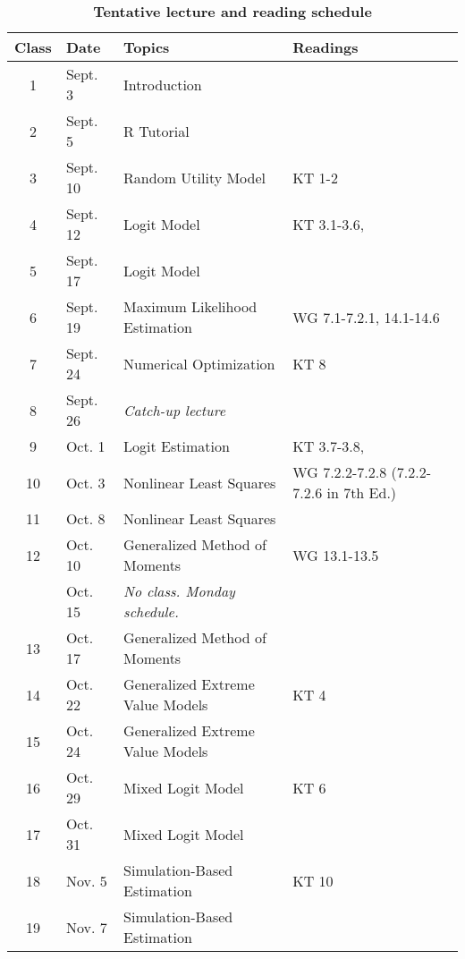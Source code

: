 \documentclass[11pt,letterpaper]{article}
\begin{document}
\begin{NoHyper}
\begin{table}[!ht]
	\centering
	\begin{threeparttable}
		\caption*{\textbf{Tentative lecture and reading schedule}}
   		\begin{tabular}{@{\extracolsep{0.35cm}} c l l l @{}}
    		\toprule
		    \textbf{Class} & \textbf{Date} & \textbf{Topics} & \textbf{Readings}\tnote{1} \\ \toprule
    		1 & Sept. 3 & Introduction & \\
    		2 & Sept. 5 & R Tutorial & \textcite{reiss_structural_2007}\\
    		3 & Sept. 10 & Random Utility Model & KT 1-2\\
    		4 & Sept. 12 & Logit Model & KT 3.1-3.6, \textcite{gruber_tax_1994} \\
    		5 & Sept. 17 & Logit Model & \textcite{adamowicz_combining_1994} \\
    		6 & Sept. 19 & Maximum Likelihood Estimation & WG 7.1-7.2.1, 14.1-14.6 \\
    		7 & Sept. 24 & Numerical Optimization & KT 8 \\
        8 & Sept. 26 & \emph{Catch-up lecture} & \\
    		9 & Oct. 1 & Logit Estimation & KT 3.7-3.8, \textcite{bayer_migration_2009} \\
    		10 & Oct. 3 & Nonlinear Least Squares & WG 7.2.2-7.2.8 (7.2.2-7.2.6 in 7th Ed.) \\
    		11 & Oct. 8 & Nonlinear Least Squares & \textcite{schaefer_dependence_1998} \\
    		12 & Oct. 10 & Generalized Method of Moments & WG 13.1-13.5 \\
        & Oct. 15 & \emph{No class. Monday schedule.} & \\        
    		13 & Oct. 17 & Generalized Method of Moments & \textcite{crawford_welfare_2012} \\
    		14 & Oct. 22 & Generalized Extreme Value Models & KT 4 \\
    		15 & Oct. 24 & Generalized Extreme Value Models & \textcite{train_demand_1987} \\
    		16 & Oct. 29 & Mixed Logit Model & KT 6 \\
    		17 & Oct. 31 & Mixed Logit Model & \textcite{revelt_mixed_1998} \\
    		18 & Nov. 5 & Simulation-Based Estimation & KT 10 \\
    		19 & Nov. 7 & Simulation-Based Estimation & \textcite{handel_adverse_2013} \\

\end{tabular}
\end{threeparttable}
\end{table}
\end{NoHyper}
\end{document}
